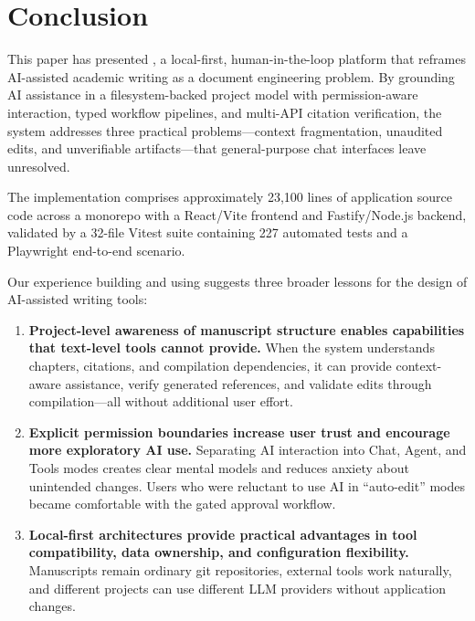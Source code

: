 \section{Conclusion}
\label{sec:conclusion}

This paper has presented \software{}, a local-first, human-in-the-loop
platform that reframes AI-assisted academic writing as a document engineering
problem. By grounding AI assistance in a filesystem-backed project model with
permission-aware interaction, typed workflow pipelines, and multi-API citation
verification, the system addresses three practical problems---context
fragmentation, unaudited edits, and unverifiable artifacts---that general-purpose
chat interfaces leave unresolved.

The implementation comprises approximately 23,100 lines of application source
code across a monorepo with a React/Vite frontend and Fastify/Node.js backend,
validated by a 32-file Vitest suite containing 227 automated tests and a
Playwright end-to-end scenario.

Our experience building and using \software{} suggests three broader lessons
for the design of AI-assisted writing tools:

\begin{enumerate}
  \item \textbf{Project-level awareness of manuscript structure enables
  capabilities that text-level tools cannot provide.} When the system
  understands chapters, citations, and compilation dependencies, it can
  provide context-aware assistance, verify generated references, and validate
  edits through compilation---all without additional user effort.

  \item \textbf{Explicit permission boundaries increase user trust and
  encourage more exploratory AI use.} Separating AI interaction into Chat,
  Agent, and Tools modes creates clear mental models and reduces anxiety about
  unintended changes. Users who were reluctant to use AI in ``auto-edit''
  modes became comfortable with the gated approval workflow.

  \item \textbf{Local-first architectures provide practical advantages in
  tool compatibility, data ownership, and configuration flexibility.}
  Manuscripts remain ordinary git repositories, external tools work
  naturally, and different projects can use different LLM providers without
  application changes.
\end{enumerate}

